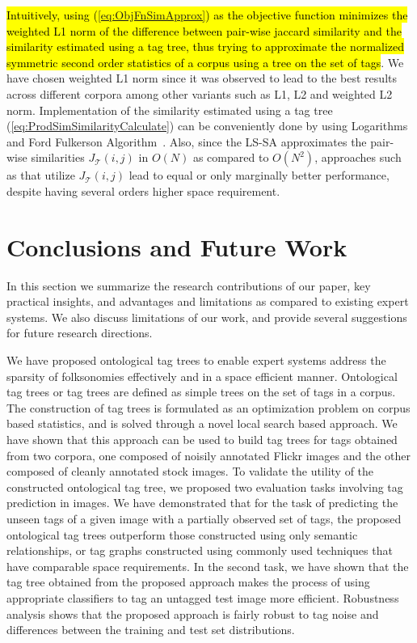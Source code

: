 \hl{Intuitively, using ({\ref{eq:ObjFnSimApprox}}) as the objective function minimizes the weighted L1 norm of the difference between pair-wise jaccard similarity and the similarity estimated using a tag tree, thus trying to approximate the normalized symmetric second order statistics of a corpus using a tree on the set of tags}. We have chosen weighted L1 norm since it was observed to lead to the best results across different corpora among other variants such as L1, L2 and weighted L2 norm. Implementation of the similarity estimated using a tag tree (\ref{eq:ProdSimSimilarityCalculate}) can be conveniently done by using Logarithms and Ford Fulkerson Algorithm~\cite{ford2010flows}. Also, since the LS-SA approximates the pair-wise similarities $J_{\mathcal{T}}(i,j)$ in $O(N)$ as compared to $O(N^2)$, approaches such as {\cite{sigurbjornsson2008flickr}} that utilize $J_{\mathcal{T}}(i,j)$ lead to equal or only marginally better performance, despite having several orders higher space requirement. \\


\section{Conclusions and Future Work}

In this section we summarize the research contributions of our paper, key practical insights, and advantages and limitations as compared to existing expert systems. We also discuss limitations of our work, and provide several suggestions for future research directions. 

We have proposed ontological tag trees to enable expert systems address the sparsity of folksonomies effectively and in a space efficient manner. Ontological tag trees or tag trees are defined as simple trees on the set of tags in a corpus. The construction of tag trees is formulated as an optimization problem on corpus based statistics, and is solved through a novel local search based approach. We have shown that this approach can be used to build tag trees for tags obtained from two corpora, one composed of noisily annotated Flickr images and the other composed of cleanly annotated stock images. To validate the utility of the constructed ontological tag tree, we proposed two evaluation tasks involving tag prediction in images.  We have demonstrated that for the task of predicting the unseen tags of a given image with a partially observed set of tags, the proposed ontological tag trees outperform those constructed using only semantic relationships, or tag graphs constructed using commonly used techniques that have comparable space requirements. In the second task, we have shown that the tag tree obtained from the proposed approach makes the process of using appropriate classifiers to tag an untagged test image more efficient. Robustness analysis shows that the proposed approach is fairly robust to tag noise and differences between the training and test set distributions.

